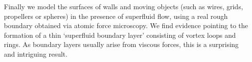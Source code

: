Finally we model the surfaces of walls and moving objects (such as wires, grids, propellers or spheres) in the presence of superfluid flow, using a real rough boundary obtained via atomic force microscopy. We find evidence pointing to the formation of a thin `superfluid boundary layer' consisting of vortex loops and rings. As boundary layers usually arise from viscous forces, this is a surprising and intriguing result.
\thispagestyle{empty}
\restoregeometry